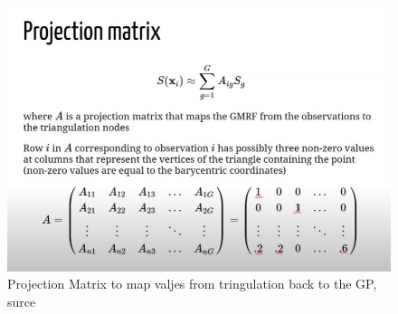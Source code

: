 \documentclass[
  12pt,
  a4paper,
  oneside]{book}
\theoremstyle{definition}
\theoremstyle{definition}
\theoremstyle{definition}
\theoremstyle{remark}
\begin{document}
\begin{figure}
\centering
\includegraphics{appendix_images/appendix_proj.jpg}
\caption{\label{fig:projmat}Projection Matrix to map valjes from tringulation back to the GP, \citet{YT:paumoraga} surce}
\end{figure}

  
\end{document}
